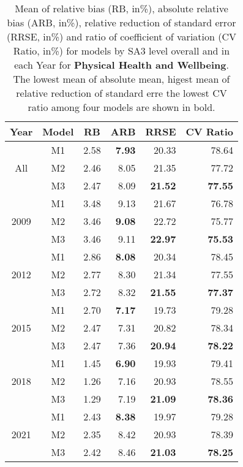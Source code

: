 \begin{table}[t]
\centering
\begin{tabular}{ccrrrr}
\hline
Year & Model & \multicolumn{1}{c}{RB} & \multicolumn{1}{c}{ARB} & \multicolumn{1}{c}{RRSE} & \multicolumn{1}{c}{CV Ratio} \\ \hline
\multirow{3}{*}{All} & M1 & 2.58 & \textbf{7.93} & 20.33 & 78.64 \\
 & M2 & 2.46 & 8.05 & 21.35 & 77.72 \\
 & M3 & 2.47 & 8.09 & \textbf{21.52} & \textbf{77.55} \\ \hline
\multirow{3}{*}{2009} & M1 & 3.48 & 9.13 & 21.67 & 76.78 \\
 & M2 & 3.46 & \textbf{9.08} & 22.72 & 75.77 \\
 & M3 & 3.46 & 9.11 & \textbf{22.97} & \textbf{75.53} \\ \hline
\multirow{3}{*}{2012} & M1 & 2.86 & \textbf{8.08} & 20.34 & 78.45 \\
 & M2 & 2.77 & 8.30 & 21.34 & 77.55 \\
 & M3 & 2.72 & 8.32 & \textbf{21.55} & \textbf{77.37} \\ \hline
\multirow{3}{*}{2015} & M1 & 2.70 & \textbf{7.17} & 19.73 & 79.28 \\
 & M2 & 2.47 & 7.31 & 20.82 & 78.34 \\
 & M3 & 2.47 & 7.36 & \textbf{20.94} & \textbf{78.22} \\ \hline
\multirow{3}{*}{2018} & M1 & 1.45 & \textbf{6.90} & 19.93 & 79.41 \\
 & M2 & 1.26 & 7.16 & 20.93 & 78.55 \\
 & M3 & 1.29 & 7.19 & \textbf{21.09} & \textbf{78.36} \\ \hline
\multirow{3}{*}{2021} & M1 & 2.43 & \textbf{8.38} & 19.97 & 79.28 \\
 & M2 & 2.35 & 8.42 & 20.93 & 78.39 \\
 & M3 & 2.42 & 8.46 & \textbf{21.03} & \textbf{78.25} \\ \hline
\end{tabular}
\caption{Mean of relative bias (RB, in\%), absolute relative bias (ARB, in\%), relative reduction of standard error (RRSE, in\%) and ratio of coefficient of variation (CV Ratio, in\%) for models by SA3 level overall and in each Year for \textbf{Physical Health and Wellbeing}. The lowest mean of absolute mean, higest mean of relative reduction of standard erre the lowest CV ratio among four models are shown in bold.}
\label{tab:Model_Part2_Health_Perf}
\end{table}